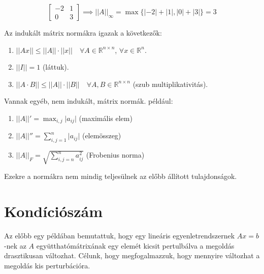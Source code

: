 \begin{pelda}
\begin{enumerate}
        \begin{equation*}
            \begin{bmatrix}
            -2 & 1 \\
            0 & 3
            \end{bmatrix}
            \implies \lvert \lvert A \rvert  \rvert _{\infty} = \max \{ \lvert -2 \rvert + \lvert 1 \rvert , \lvert 0 \rvert + \lvert 3 \rvert  \} = 3
        \end{equation*}
    \end{enumerate}
\end{pelda}

\begin{allitas}
    Az indukált mátrix normákra igazak a következők:
    \begin{enumerate}
        \item $\lvert \lvert Ax \rvert \rvert \leq \lvert \lvert A \rvert \rvert \cdot \lvert \lvert x \rvert \rvert \quad \forall A \in \mathbb{R}^{n \times n}$, $\forall x \in \mathbb{R}^{n}$.

        \item $\lvert \lvert I \rvert \rvert = 1$ (láttuk).

        \item $\lvert \lvert A \cdot B \rvert \rvert \leq \lvert \lvert A \rvert \rvert \cdot \lvert \lvert B \rvert \rvert \quad \forall A, B \in \mathbb{R}^{n\times n}$ (szub multiplikativitás).
    \end{enumerate}
\end{allitas}

\begin{megj}
    Vannak egyéb, nem indukált, mátrix normák. például:
    \begin{enumerate}
        \item $\lvert \lvert A \rvert \rvert' = \max_{i, j} \lvert a_{ij} \rvert$ (maximális elem)
        \item $\lvert \lvert A \rvert \rvert'' = \sum_{i, j = 1} ^{n} \lvert a_{ij} \rvert$ (elemösszeg)
        \item $\lvert \lvert A \rvert \rvert_{F} = \sqrt{ \sum_{i, j = n} ^{n} a_{ij}^{2} }$ (Frobenius norma)
    \end{enumerate}
    Ezekre a normákra nem mindig teljesülnek az előbb állított tulajdonságok.
\end{megj}

\section{Kondíciószám}
Az előbb egy példában bemutattuk, hogy egy lineáris egyenletrendszernek $Ax = b$-nek az $A$ együtthatómátrixának egy elemét kicsit pertulbálva a megoldás drasztikusan változhat. Célunk, hogy megfogalmazzuk, hogy mennyire változhat a megoldás kis perturbációra.

